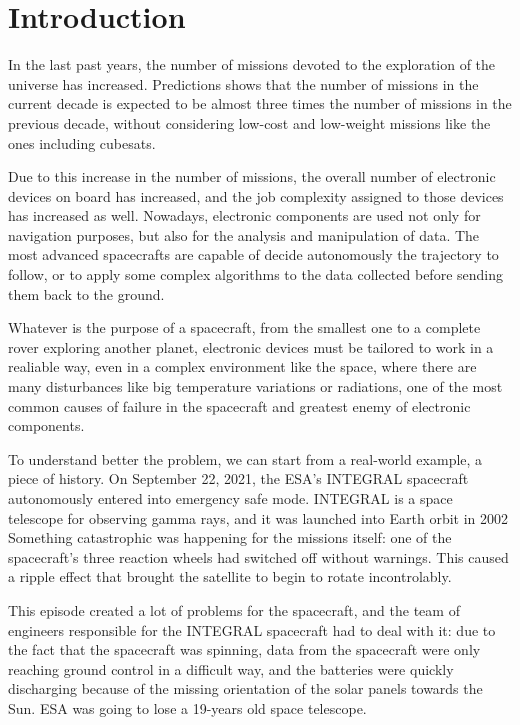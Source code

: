 \chapter{Introduction}
\label{sec:Introduction}

In the last past years, the number of missions devoted to the exploration of the universe has increased. Predictions shows that the number of missions in the current decade is expected to be almost three times the number of missions in the previous decade, without considering low-cost and low-weight missions like the ones including cubesats. \bigskip

Due to this increase in the number of missions, the overall number of electronic devices on board has increased, and the job complexity assigned to those devices has increased as well. Nowadays, electronic components are used not only for navigation purposes, but also for the analysis and manipulation of data. The most advanced spacecrafts are capable of decide autonomously the trajectory to follow, or to apply some complex algorithms to the data collected before sending them back to the ground. \bigskip

Whatever is the purpose of a spacecraft, from the smallest one to a complete rover exploring another planet, electronic devices must be tailored to work in a realiable way, even in a complex environment like the space, where there are many disturbances like big temperature variations or radiations, one of the most common causes of failure in the spacecraft and greatest enemy of electronic components. \bigskip

To understand better the problem, we can start from a real-world example, a piece of history. On September 22, 2021, the ESA's INTEGRAL spacecraft autonomously entered into emergency safe mode. INTEGRAL is a space telescope for observing gamma rays, and it was launched into Earth orbit in 2002 Something catastrophic was happening for the missions itself: one of the spacecraft's three reaction wheels had switched off without warnings. This caused a ripple effect that brought the satellite to begin to rotate incontrolably. \bigskip

This episode created a lot of problems for the spacecraft, and the team of engineers responsible for the INTEGRAL spacecraft had to deal with it: due to the fact that the spacecraft was spinning, data from the spacecraft were only reaching ground control in a difficult way, and the batteries were quickly discharging because of the missing orientation of the solar panels towards the Sun. ESA was going to lose a 19-years old space telescope. \bigskip

